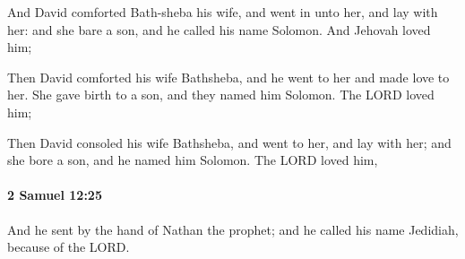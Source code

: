 			\begin{versebox}
					\item[BHS] 
					\item[ASV] And David comforted Bath-sheba his wife, and went in unto her, and lay with her: and she bare a son, and he called his name Solomon. And Jehovah loved him;
					\item[NIV] Then David comforted his wife Bathsheba, and he went to her and made love to her. She gave birth to a son, and they named him Solomon. The LORD loved him;
					\item[NRSV] Then David consoled his wife Bathsheba, and went to her, and lay with her; and she bore a son, and he named him Solomon. The LORD loved him,
			\end{versebox}

		\paragraph{2 Samuel 12:25} %
			\label{2SAMUEL-12-25}

			And he sent by the hand of Nathan the prophet; and he called his name Jedidiah, because of the LORD.

